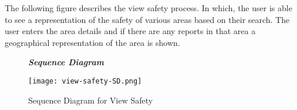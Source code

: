 The following figure describes the view safety process. In which, the user is able to see a representation of the safety of various areas based on their search. The user enters the area details and if there are any reports in that area a geographical representation of the area is shown.

\begin{figure}[H]
\begin{flushleft}\emph{\textbf{Sequence Diagram}}\end{flushleft}
\caption{Sequence Diagram for View Safety}
\label{fig:SD-View-Safety}
\centering
\texttt{[image: view-safety-SD.png]}
\end{figure}


